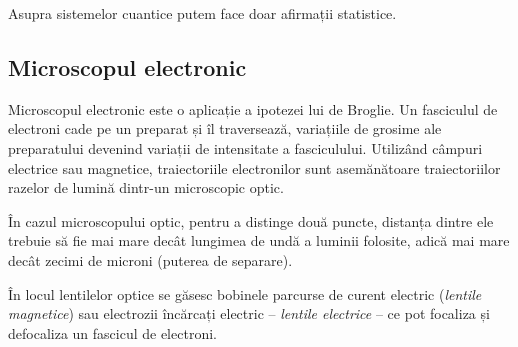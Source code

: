 Asupra sistemelor cuantice putem face doar afirmații statistice.

\subsection*{Microscopul electronic}

Microscopul electronic este o aplicație a ipotezei lui de Broglie. Un
fasciculul de electroni cade pe un preparat și îl traversează, variațiile de
grosime ale preparatului devenind variații de intensitate a fasciculului.
Utilizând câmpuri electrice sau magnetice, traiectoriile electronilor sunt
asemănătoare traiectoriilor razelor de lumină dintr-un microscopic optic.

În cazul microscopului optic, pentru a distinge două puncte, distanța dintre
ele trebuie să fie mai mare decât lungimea de undă a luminii folosite, adică
mai mare decât zecimi de microni (puterea de separare).

În locul lentilelor optice se găsesc bobinele parcurse de curent electric
(\emph{lentile magnetice}) sau electrozii încărcați electric
-- \emph{lentile electrice} -- ce pot focaliza și defocaliza un fascicul de
electroni.

\parbreak

